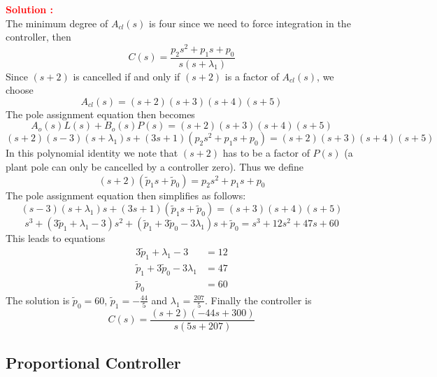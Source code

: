 \documentclass[12pt]{article}
\begin{document}
\textbf{\textcolor{red}{Solution :}} \\ 
The minimum degree of $A_{cl}(s)$ is four since we need to force integration in the controller, then
\begin{equation}
C(s) = \frac{p_2s^2 + p_1s + p_0}{s(s + \lambda_1)}
\end{equation}
Since $(s + 2)$ is cancelled if and only if $(s + 2)$ is a factor of $A_{cl}(s)$, we choose
\begin{equation}
A_{cl}(s) = (s + 2)(s + 3)(s + 4)(s + 5)
\end{equation}
The pole assignment equation then becomes
\begin{equation}
A_o(s)L(s) + B_o(s)P(s) = (s + 2)(s + 3)(s + 4)(s + 5)
\end{equation}
\begin{equation}
(s + 2)(s - 3)(s + \lambda_1)s + (3s + 1)(p_2s^2 + p_1s + p_0) = (s + 2)(s + 3)(s + 4)(s + 5)
\end{equation}
In this polynomial identity we note that $(s + 2)$ has to be a factor of $P(s)$ (a plant pole can only be cancelled by a controller zero). Thus we define
\begin{equation}
(s + 2)(\tilde{p}_1s + \tilde{p}_0) = p_2s^2 + p_1s + p_0
\end{equation}
The pole assignment equation then simplifies as follows:
\begin{equation}
(s - 3)(s + \lambda_1)s + (3s + 1)(\tilde{p}_1s + \tilde{p}_0) = (s + 3)(s + 4)(s + 5)
\end{equation}
\begin{equation}
s^3 + (3\tilde{p}_1 + \lambda_1 - 3)s^2 + (\tilde{p}_1 + 3\tilde{p}_0 - 3\lambda_1)s + \tilde{p}_0 = s^3 + 12s^2 + 47s + 60
\end{equation}
This leads to equations
\begin{align}
3\tilde{p}_1 + \lambda_1 - 3 &= 12 \\
\tilde{p}_1 + 3\tilde{p}_0 - 3\lambda_1 &= 47 \\
\tilde{p}_0 &= 60
\end{align}
The solution is $\tilde{p}_0 = 60$, $\tilde{p}_1 = -\frac{44}{5}$ and $\lambda_1 = \frac{207}{5}$. Finally the controller is
\begin{equation}
C(s) = \frac{(s + 2)(-44s + 300)}{s(5s + 207)}
\end{equation}

\clearpage
\subsection{Proportional Controller}
\end{document}

